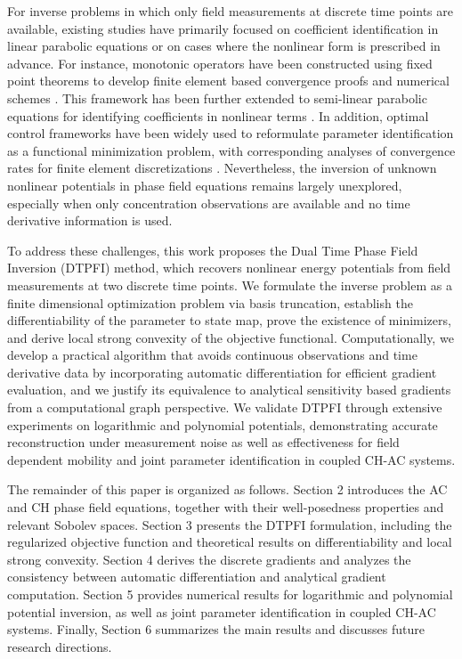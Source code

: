 \documentclass[11pt,reqno]{amsart}
\begin{document}
For inverse problems in which only field measurements at discrete time points are available, existing studies have primarily focused on coefficient identification in linear parabolic equations or on cases where the nonlinear form is prescribed in advance. For instance, monotonic operators have been constructed using fixed point theorems to develop finite element based convergence proofs and numerical schemes \cite{zhang2022identification}. This framework has been further extended to semi-linear parabolic equations for identifying coefficients in nonlinear terms \cite{kaltenbacher2025reconstruction,kaltenbacher2026identification}. In addition, optimal control frameworks have been widely used to reformulate parameter identification as a functional minimization problem, with corresponding analyses of convergence rates for finite element discretizations \cite{kahle2020parameter,jin2021error,jin2023convergence,zhang2022identification}. Nevertheless, the inversion of unknown nonlinear potentials in phase field equations remains largely unexplored, especially when only concentration observations are available and no time derivative information is used.

To address these challenges, this work proposes the Dual Time Phase Field Inversion (DTPFI) method, which recovers nonlinear energy potentials from field measurements at two discrete time points. We formulate the inverse problem as a finite dimensional optimization problem via basis truncation, establish the differentiability of the parameter to state map, prove the existence of minimizers, and derive local strong convexity of the objective functional. Computationally, we develop a practical algorithm that avoids continuous observations and time derivative data by incorporating automatic differentiation for efficient gradient evaluation, and we justify its equivalence to analytical sensitivity based gradients from a computational graph perspective. We validate DTPFI through extensive experiments on logarithmic and polynomial potentials, demonstrating accurate reconstruction under measurement noise as well as effectiveness for field dependent mobility and joint parameter identification in coupled CH-AC systems.

The remainder of this paper is organized as follows. Section 2 introduces the AC and CH phase field equations, together with their well-posedness properties and relevant Sobolev spaces. Section 3 presents the DTPFI formulation, including the regularized objective function and theoretical results on differentiability and local strong convexity. Section 4 derives the discrete gradients and analyzes the consistency between automatic differentiation and analytical gradient computation. Section 5 provides numerical results for logarithmic and polynomial potential inversion, as well as  joint parameter identification in coupled CH-AC systems. Finally, Section 6 summarizes the main results and discusses future research directions.
\end{document}
